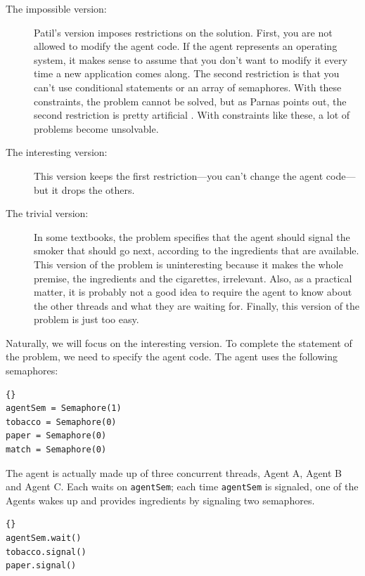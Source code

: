 \documentclass{book}
\begin{document}
\begin{description}

\item[The impossible version:] Patil's version imposes restrictions on
the solution.  First, you are not allowed to modify the agent code.
If the agent represents an operating system, it makes sense to assume
that you don't want to modify it every time a new application comes
along.  The second restriction is that you can't use conditional
statements or an array of semaphores.  With these constraints, the
problem cannot be solved, but as Parnas points out, the second
restriction is pretty artificial \cite{Parnas}.  With constraints like
these, a lot of problems become unsolvable.

\item[The interesting version:] This version keeps the first
restriction---you can't change the agent code---but it drops the others.

\item[The trivial version:] In some textbooks, the problem specifies
that the agent should signal the smoker that should go next, according
to the ingredients that are available.  This version of the problem
is uninteresting because it makes the whole premise, the ingredients
and the cigarettes, irrelevant.  Also, as a practical matter, it is
probably not a good idea to require the agent to know about the other
threads and what they are waiting for.  Finally, this version of
the problem is just too easy.

\end{description}

Naturally, we will focus on the interesting version.  To complete
the statement of the problem, we need to specify the agent code.
The agent uses the following semaphores:

\begin{lstlisting}[title={Agent semaphores}]{}
agentSem = Semaphore(1)
tobacco = Semaphore(0)
paper = Semaphore(0)
match = Semaphore(0)
\end{lstlisting}

The agent is actually made up of three concurrent
threads, Agent A, Agent B and Agent C.  Each waits on
{\tt agentSem}; each time {\tt agentSem} is signaled,
one of the Agents wakes up and provides ingredients by
signaling two semaphores.

\begin{lstlisting}[title={Agent A code}]{}
agentSem.wait()
tobacco.signal()
paper.signal()
\end{lstlisting}
\end{document}
